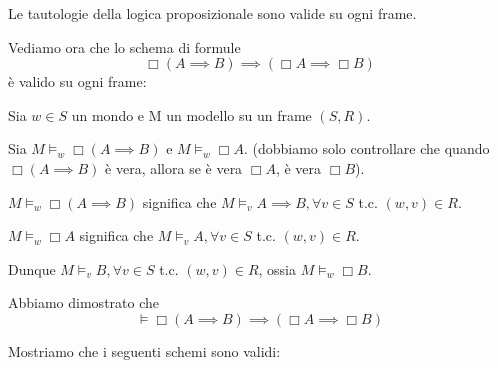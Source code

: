 \documentclass[../main.tex]{subfiles}
\begin{document}
\begin{remark}
    Le tautologie della logica proposizionale sono valide su ogni frame.
\end{remark}
\begin{example}
    Vediamo ora che lo schema di formule
    \[
        \Box (A \implies B) \implies (\Box A \implies \Box B)
    \]
    è valido su ogni frame:

    Sia $w \in S$ un mondo e M un modello su un frame $(S,R)$.

    Sia $M \vDash_w \Box (A \implies B)$ e $M \vDash_w \Box A$. (dobbiamo solo controllare che quando $\Box ( A \implies B )$ è vera, allora se è vera $\Box A$, è vera $\Box B$).

    $M \vDash_w \Box (A \implies B)$ significa che $M \vDash_v A \implies B, \forall v \in S$ t.c. $(w,v) \in R$.

    $M \vDash_w \Box A$ significa che $M \vDash_v A, \forall v \in S$ t.c. $(w,v) \in R$.

    Dunque $M \vDash_v B, \forall v \in S$ t.c. $(w,v) \in R$, ossia $M \vDash_w \Box B$.

    Abbiamo dimostrato che
    \[
        \vDash \Box (A \implies B) \implies (\Box A \implies \Box B)
    \]
\end{example}
Mostriamo che i seguenti schemi sono validi:
\end{document}
